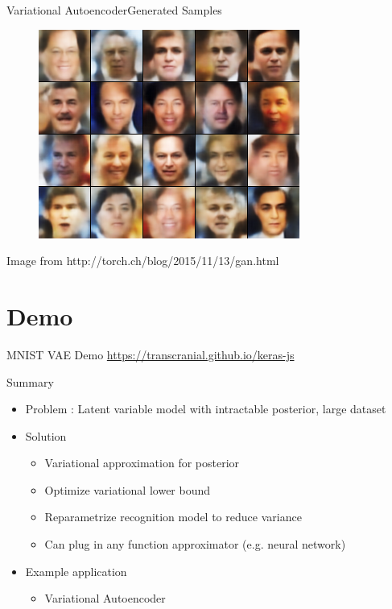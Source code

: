 \documentclass{beamer}
\begin{document}
\begin{frame}{Variational Autoencoder}{Generated Samples}
    \begin{figure}
        \centering
        \includegraphics[height=0.7\textheight]{vae_faces}
    \end{figure}
    {\small Image from http://torch.ch/blog/2015/11/13/gan.html}
\end{frame}

\section{Demo}

\begin{frame}{MNIST VAE Demo}
    \url{https://transcranial.github.io/keras-js}
\end{frame}

\begin{frame}{Summary}
    \begin{itemize}
        \item {
            Problem : Latent variable model with intractable posterior, large dataset
        }
        \item {
            Solution
            \begin{itemize}
                \item Variational approximation for posterior
                \item Optimize variational lower bound
                \item Reparametrize recognition model to reduce variance
                \item Can plug in any function approximator (e.g. neural network)
            \end{itemize}
        }
        \item {Example application
            \begin{itemize}
                \item Variational Autoencoder
            \end{itemize}
        }
    \end{itemize}
\end{frame}
\end{document}
